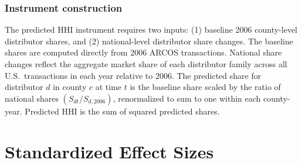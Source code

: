 \documentclass[12pt]{article}
\begin{document}
\subsubsection*{Instrument construction} The predicted HHI instrument requires two inputs: (1) baseline 2006 county-level distributor shares, and (2) national-level distributor share changes. The baseline shares are computed directly from 2006 ARCOS transactions. National share changes reflect the aggregate market share of each distributor family across all U.S.\ transactions in each year relative to 2006. The predicted share for distributor $d$ in county $c$ at time $t$ is the baseline share scaled by the ratio of national shares $(S_{dt}/S_{d,2006})$, renormalized to sum to one within each county-year. Predicted HHI is the sum of squared predicted shares.

\section{Standardized Effect Sizes}
\label{sec:sde}


\end{document}
